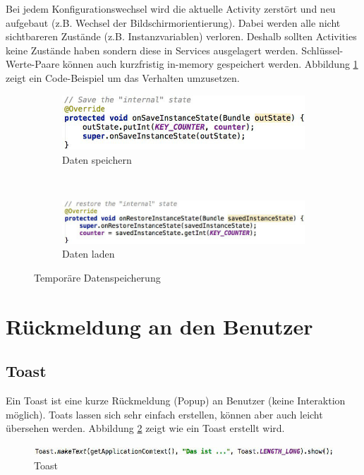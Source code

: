 Bei jedem Konfigurationswechsel wird die aktuelle Activity zerstört und neu aufgebaut (z.B. Wechsel der Bildschirmorientierung). Dabei werden alle nicht sichtbareren Zustände (z.B. Instanzvariablen) verloren. Deshalb sollten Activities keine Zustände haben sondern diese in Services ausgelagert werden. Schlüssel-Werte-Paare können auch kurzfristig in-memory gespeichert werden. Abbildung \ref{fig:instance-state} zeigt ein Code-Beispiel um das Verhalten umzusetzen.
\begin{figure}
	\centering
	\begin{subfigure}[b]{0.48\textwidth}
		\includegraphics[width=\textwidth]{fig/save-instance}
		\caption{Daten speichern}
	\end{subfigure}
	~
	\begin{subfigure}[b]{0.48\textwidth}
		\includegraphics[width=\textwidth]{fig/restore-instance}
		\caption{Daten laden}
	\end{subfigure}
	\caption{Temporäre Datenspeicherung}
	\label{fig:instance-state}
\end{figure}

\section{Rückmeldung an den Benutzer}

\subsection{Toast}

Ein Toast ist eine kurze Rückmeldung (Popup) an Benutzer (keine Interaktion möglich). Toats lassen sich sehr einfach erstellen, können aber auch leicht übersehen werden. Abbildung \ref{fig:toast} zeigt wie ein Toast erstellt wird.
\begin{figure}
\centering
\includegraphics[width=\linewidth]{fig/toast}
\caption{Toast}
\label{fig:toast}
\end{figure}

